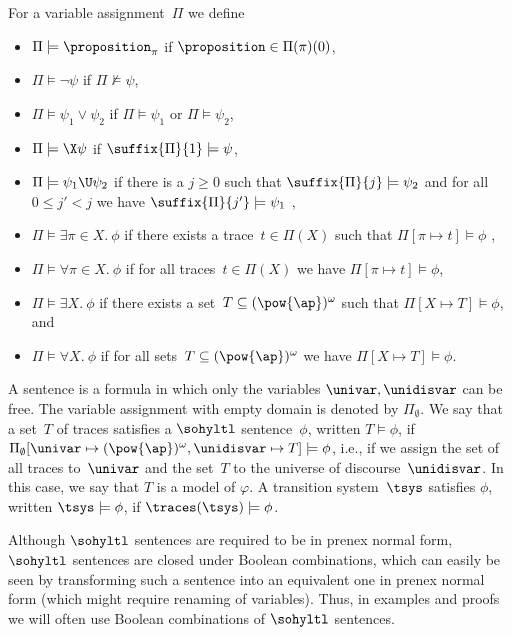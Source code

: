 For a variable assignment~$\Pi$ we define 
\begin{itemize}
	\item $\Pi \models \proposition_\pi$ if $\proposition \in \Pi(\pi)(0)$,
	\item $\Pi \models \neg \psi$ if $\Pi \not\models \psi$,
	\item $\Pi \models \psi_1 \vee \psi_2 $ if $\Pi \models \psi_1$ or $\Pi  \models \psi_2$,
	\item $\Pi \models \X \psi$ if $\suffix{\Pi}{1} \models \psi$,
	\item $\Pi \models \psi_1 \U \psi_2$ if there is a $j \ge 0$ such that $\suffix{\Pi}{j} \models \psi_2$ and for all $0 \le j' < j$ we have $ \suffix{\Pi}{j'} \models \psi_1$ ,
	\item $\Pi \models \exists \pi \in X.\ \phi$ if there exists a trace~$t \in \Pi(X)$ such that $\Pi[\pi \mapsto t] \models \phi$ ,
	\item $\Pi \models \forall \pi \in X.\ \phi$ if for all traces~$t \in \Pi(X)$ we have $\Pi[\pi \mapsto t] \models \phi$,
    \item $\Pi \models \exists X.\ \phi$ if there exists a set~$T \subseteq (\pow{\ap})^\omega$ such that $\Pi[X\mapsto T] \models \phi$, and
    \item $\Pi \models \forall X.\ \phi$ if for all sets~$T \subseteq (\pow{\ap})^\omega$ we have $\Pi[X\mapsto T] \models \phi$.
\end{itemize}

A sentence is a formula in which only the variables $\univar,\unidisvar$ can be free. 
The variable assignment with empty domain is denoted by $\Pi_\emptyset$. 
We say that a set~$T$ of traces satisfies a $\sohyltl$ sentence~$\phi$, written $T \models \phi$, if $\Pi_\emptyset[\univar \mapsto (\pow{\ap})^\omega, \unidisvar \mapsto T]\models \phi$, i.e., if we assign the set of all traces to~$\univar$ and the set~$T$ to the universe of discourse~$\unidisvar$.
In this case, we say that $T$ is a model of $\varphi$.
A transition system~$\tsys$ satisfies $\phi$, written $\tsys \models \phi$, if $\traces(\tsys)\models \phi$. 


Although $\sohyltl$ sentences are required to be in prenex normal form, $\sohyltl$ sentences are closed under Boolean combinations, which can easily be seen by transforming such a sentence into an equivalent one in prenex normal form (which might require renaming of variables).
Thus, in examples and proofs we will often use Boolean combinations of $\sohyltl$ sentences. 


